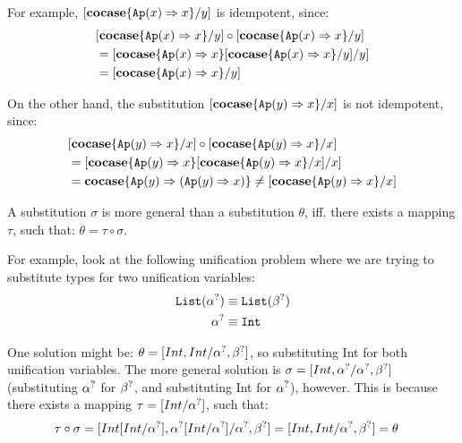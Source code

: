 \documentclass[twoside,12pt,a4paper]{article}
\begin{document}
For example, $[\textbf{cocase}\{\texttt{Ap}(x)\Rightarrow x\} / y]$ is idempotent, since:
\begin{align*}
    &[\textbf{cocase}\{\texttt{Ap}(x)\Rightarrow x\} / y] \circ [\textbf{cocase}\{\texttt{Ap}(x)\Rightarrow x\} / y] \\
    &= [\textbf{cocase}\{\texttt{Ap}(x)\Rightarrow x\}[\textbf{cocase}\{\texttt{Ap}(x)\Rightarrow x\} / y] / y] \\
    &= [\textbf{cocase}\{\texttt{Ap}(x)\Rightarrow x\} / y] 
\end{align*}

On the other hand, the substitution $[\textbf{cocase}\{\texttt{Ap}(y)\Rightarrow x\} / x]$ is not idempotent, since:
\begin{align*}
    &[\textbf{cocase}\{\texttt{Ap}(y)\Rightarrow x\} / x] \circ [\textbf{cocase}\{\texttt{Ap}(y)\Rightarrow x\} / x]\\ 
    &= [\textbf{cocase}\{\texttt{Ap}(y)\Rightarrow x\}[\textbf{cocase}\{\texttt{Ap}(y)\Rightarrow x\} / x] / x] \\
    &= \textbf{cocase}\{\texttt{Ap}(y)\Rightarrow (\texttt{Ap}(y)\Rightarrow x) \} \neq [\textbf{cocase}\{\texttt{Ap}(y)\Rightarrow x\} / x]
\end{align*}

\begin{definition} 
    A substitution $\sigma$ is more general than a substitution $\theta$, iff. there exists a mapping $\tau$, such that: $\theta = \tau \circ \sigma$.
\end{definition} %

For example, look at the following unification problem where we are trying to substitute types for two unification variables:
\begin{align*}
    \texttt{List}(\alpha^?) &\equiv \texttt{List}(\beta^?)\\
    \alpha^? &\equiv \texttt{Int}
\end{align*}

One solution might be: $\theta = [Int, Int / \alpha^?, \beta^?]$, 
so substituting Int for both unification variables.
The more general solution is $\sigma = [Int,\alpha^? / \alpha^?, \beta^?]$ (substituting $\alpha^?$ for $\beta^?$, and substituting Int for $\alpha^?$), however.
This is because there exists a mapping $\tau = [Int / \alpha^?]$, such that:
\begin{align*}
    \tau \circ \sigma &= [Int[Int/\alpha^?], \alpha^?[Int/\alpha^?] / \alpha^?, \beta^?]= [Int, Int / \alpha^?, \beta^?]= \theta
\end{align*}
\iffalse
For example, for the problem $\alpha x = zx$, both $\sigma_1 = [z/\alpha]$ and $\sigma_2 = [\lambda y.zx, \lambda y.zx/ \alpha, z]$ are solutions, %
but $\sigma_1$ is more general than $\sigma_2$, since there exists a substitution $\sigma_3 = [\lambda y.zx/z]$, and:
\begin{align*}
    \sigma_3 \circ \sigma_1 = [z[\lambda y.zx/z], \lambda y.zx /\alpha, z] = [(\lambda y.zx), \lambda y.zx /\alpha, z] = \sigma_2  
\end{align*}
\fi
\end{document}

